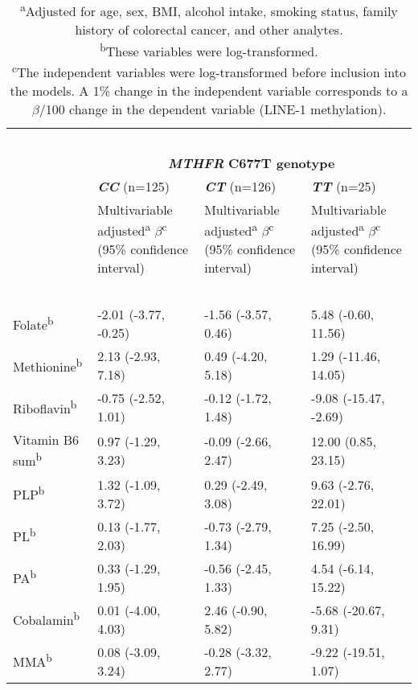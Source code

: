 \begin{table}
\small
\caption{Associations between plasma B vitamins and LINE-1 methylation according to \emph{MTHFR} C677T genotype.}
\label{table5_4}
\begin{adjustbox}{width=\textwidth}
\begin{tabular}{L{2.3cm}C{3.7cm}C{3.7cm}C{3.5cm}}

\hline
~ & ~ & ~ & ~ \\
 ~ & \\ ~ & \textbf{\textit{CC}} (n=125) & \textbf{\textit{CT}} (n=126) & \textbf{\textit{TT}} (n=25)\\
~ & { Multivariable adjusted\textsuperscript{a}}{ $\beta $\textsuperscript{c}}
(95\% confidence interval) & { Multivariable adjusted\textsuperscript{a}}{ $\beta $\textsuperscript{c}}
(95\% confidence interval) & { Multivariable adjusted\textsuperscript{a}}{ $\beta $\textsuperscript{c}}
(95\% confidence interval)\\
~ & ~ & ~ & ~ \\
\hline
 Folate\textsuperscript{b} & -2.01 (-3.77, -0.25) & -1.56 (-3.57, 0.46) & 5.48 (-0.60, 11.56)\\
 Methionine\textsuperscript{b} & 2.13 (-2.93, 7.18) & 0.49 (-4.20, 5.18) & 1.29 (-11.46, 14.05)\\
 Riboflavin\textsuperscript{b} & -0.75 (-2.52, 1.01) & -0.12 (-1.72, 1.48) & -9.08 (-15.47, -2.69)\\
 Vitamin B6 sum\textsuperscript{b} & 0.97 (-1.29, 3.23) & -0.09 (-2.66, 2.47) & 12.00 (0.85, 23.15)\\
 PLP\textsuperscript{b} & 1.32 (-1.09, 3.72) & 0.29 (-2.49, 3.08) & 9.63 (-2.76, 22.01)\\
 PL\textsuperscript{b} & 0.13 (-1.77, 2.03) & -0.73 (-2.79, 1.34) & 7.25 (-2.50, 16.99)\\
 PA\textsuperscript{b} & 0.33 (-1.29, 1.95) & -0.56 (-2.45, 1.33) & 4.54 (-6.14, 15.22)\\
 Cobalamin\textsuperscript{b} & 0.01 (-4.00, 4.03) & 2.46 (-0.90, 5.82) & -5.68 (-20.67, 9.31)\\
 MMA\textsuperscript{b} & 0.08 (-3.09, 3.24) & -0.28 (-3.32, 2.77) & -9.22 (-19.51, 1.07)\\
\hline
\end{tabular}
\end{adjustbox}
\caption*{\footnotesize{\textsuperscript{a}Adjusted for age, sex, BMI, alcohol intake, smoking status, family history of colorectal cancer, and other analytes.\\\textsuperscript{b}These variables were log-transformed.\\\textsuperscript{c}The independent variables were log-transformed before inclusion into the models. A 1\% change in the independent variable corresponds to a $\beta$/100 change in the dependent variable (LINE-1 methylation).}}
\end{table}

